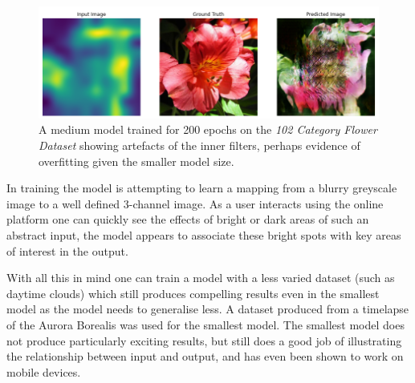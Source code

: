 \documentclass{article}
\begin{document}
\begin{figure}[h!]
	\centering
	\includegraphics[scale=0.3]{artefacts}
	\caption{A medium model trained for 200 epochs on the \textit{102 Category Flower Dataset}\cite{flowers_dataset} showing artefacts of the inner filters, perhaps evidence of overfitting given the smaller model size.}
	\label{fig:kernelsInOutput}
\end{figure}

In training the model is attempting to learn a mapping from a blurry greyscale image to a well defined 3-channel image. As a user interacts using the online platform one can quickly see the effects of bright or dark areas of such an abstract input, the model appears to associate these bright spots with key areas of interest in the output.

With all this in mind one can train a model with a less varied dataset (such as daytime clouds) which still produces compelling results even in the smallest model as the model needs to generalise less. A dataset produced from a timelapse of the Aurora Borealis was used for the smallest model. The smallest model does not produce particularly exciting results, but still does a good job of illustrating the relationship between input and output, and has even been shown to work on mobile devices.
\end{document}
